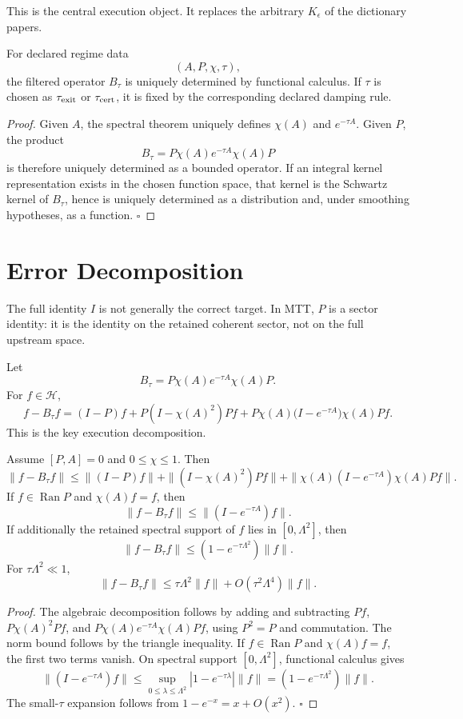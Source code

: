 \documentclass[11pt]{article}
\begin{document}
This is the central execution object. It replaces the arbitrary \(K_\epsilon\) of the dictionary papers.

\begin{theorem}
For declared regime data
\[
(A,P,\chi,\tau),
\]
the filtered operator \(B_\tau\) is uniquely determined by functional calculus. If \(\tau\)
is chosen as \(\tau_{\rm exit}\) or \(\tau_{\rm cert}\), it is fixed by the corresponding declared
damping rule.
\end{theorem}

\begin{proof}
Given \(A\), the spectral theorem uniquely defines \(\chi(A)\) and \(e^{-\tau A}\). Given \(P\), the product
\[
B_\tau=P\chi(A)e^{-\tau A}\chi(A)P
\]
is therefore uniquely determined as a bounded operator. If an integral kernel representation exists in the chosen function space, that kernel is the Schwartz kernel of \(B_\tau\), hence is uniquely determined as a distribution and, under smoothing hypotheses, as a function. \(\square\)
\end{proof}

\section{Error Decomposition}

The full identity \(I\) is not generally the correct target. In MTT, \(P\) is a sector identity: it is the identity on the retained coherent sector, not on the full upstream space.

Let
\[
B_\tau=P\chi(A)e^{-\tau A}\chi(A)P.
\]
For \(f\in\mathcal H\),
\[
f-B_\tau f
=
(I-P)f
+
P(I-\chi(A)^2)Pf
+
P\chi(A)\big(I-e^{-\tau A}\big)\chi(A)Pf .
\]
This is the key execution decomposition.

\begin{theorem}
Assume \([P,A]=0\) and \(0\le\chi\le1\). Then
\[
\|f-B_\tau f\|
\le
\|(I-P)f\|
+
\|(I-\chi(A)^2)Pf\|
+
\|\chi(A)(I-e^{-\tau A})\chi(A)Pf\|.
\]
If \(f\in\operatorname{Ran}P\) and \(\chi(A)f=f\), then
\[
\|f-B_\tau f\|
\le
\|(I-e^{-\tau A})f\|.
\]
If additionally the retained spectral support of \(f\) lies in \([0,\Lambda^2]\), then
\[
\|f-B_\tau f\|
\le
\left(1-e^{-\tau\Lambda^2}\right)\|f\|.
\]
For \(\tau\Lambda^2\ll1\),
\[
\|f-B_\tau f\|
\le
\tau\Lambda^2\|f\|+O(\tau^2\Lambda^4)\|f\|.
\]
\end{theorem}

\begin{proof}
The algebraic decomposition follows by adding and subtracting \(Pf\), \(P\chi(A)^2Pf\), and \(P\chi(A)e^{-\tau A}\chi(A)Pf\), using \(P^2=P\) and commutation. The norm bound follows by the triangle inequality. If \(f\in\operatorname{Ran}P\) and \(\chi(A)f=f\), the first two terms vanish. On spectral support \([0,\Lambda^2]\), functional calculus gives
\[
\|(I-e^{-\tau A})f\|
\le
\sup_{0\le\lambda\le\Lambda^2}|1-e^{-\tau\lambda}|\|f\|
=
(1-e^{-\tau\Lambda^2})\|f\|.
\]
The small-\(\tau\) expansion follows from \(1-e^{-x}=x+O(x^2)\). \(\square\)
\end{proof}
\end{document}
